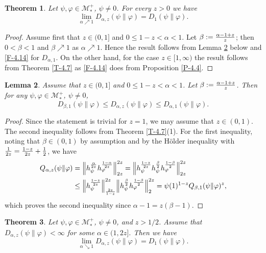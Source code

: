 \documentclass[12pt]{article}
\newtheorem{theorem}{Theorem}[section]
\newtheorem{lemma}[theorem]{Lemma}
\theoremstyle{definition}
\theoremstyle{remark}
\numberwithin{equation}{section}
\def\Me{\mathcal M}
\def\ffi{\varphi}
\begin{document}
\begin{theorem}
Let $\psi,\ffi\in\Me_*^+$, $\psi\ne0$. For every $z>0$ we have
\[
\lim_{\alpha\nearrow1}D_{\alpha,z}(\psi\|\ffi)=D_1(\psi\|\ffi).
\]
\end{theorem}

\begin{proof}
Assume first that $z\in(0,1]$ and $0\le1-z<\alpha<1$. Let $\beta:={\alpha-1+z\over z}$; then
$0<\beta<1$ and $\beta\nearrow1$ as $\alpha\nearrow1$. Hence the result follows from Lemma \ref{L-5.8}
below and \eqref{F-4.14} for $D_{\alpha,1}$. On the other hand, for the case $z\in[1,\infty)$ the result
follows from Theorem \ref{T-4.7} as \eqref{F-4.14} does from Proposition \ref{P-4.4}.
\end{proof}

\begin{lemma}\label{L-5.8}
Assume that $z\in(0,1]$ and $0\le1-z<\alpha<1$. Let $\beta:={\alpha-1+z\over z}$. Then for any
$\psi,\ffi\in\Me_*^+$, $\psi\ne0$,
\[
D_{\beta,1}(\psi\|\ffi)\le D_{\alpha,z}(\psi\|\ffi)\le D_{\alpha,1}(\psi\|\ffi).
\]
\end{lemma}

\begin{proof}
Since the statement is trivial for $z=1$, we may assume that $z\in(0,1)$. The second inequality follows
from Theorem \ref{T-4.7}(1). For the first inequality, noting that $\beta\in(0,1)$ by assumption and 
by the H\"older inequality with ${1\over2z}={1-z\over2z}+{1\over2}$, we have
\begin{align*}
Q_{\alpha,z}(\psi\|\ffi)&=\Big\|h_\psi^{\alpha\over2z}h_\ffi^{1-\alpha\over2z}\Big\|_{2z}^{2z}
=\Big\|h_\psi^{1-z\over2z}h_\psi^{\beta\over2}h_\ffi^{1-\beta\over2}\Big\|_{2z}^{2z} \\
&\le\Big\|h_\psi^{1-z\over2z}\Big\|_{2z\over1-z}^{2z}
\Big\|h_\psi^{\beta\over2}h_\ffi^{1-\beta\over2}\Big\|_2^{2z}
=\psi(1)^{1-z}Q_{\beta,1}(\psi\|\ffi)^z,
\end{align*}
which proves the second inequality since $\alpha-1=z(\beta-1)$.
\end{proof}

\begin{theorem}\label{T-5.9}
Let $\psi,\ffi\in\Me_*^+$, $\psi\ne0$, and $z>1/2$. Assume that $D_{\alpha,z}(\psi\|\ffi)<\infty$ for some
$\alpha\in(1,2z]$. Then we have
\[
\lim_{\alpha\searrow1}D_{\alpha,z}(\psi\|\ffi)=D_1(\psi\|\ffi).
\]
\end{theorem}
\end{document}
